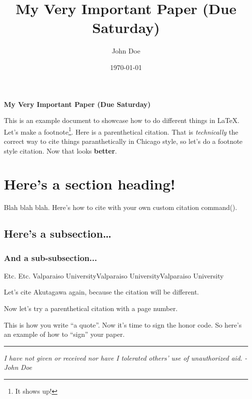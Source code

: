 \documentclass[letterpaper]{turabian-researchpaper}
\title{My Very Important Paper (Due Saturday)}
\subtitle{}
\author{John Doe}
\date{\today}
\newcommand{\ccparencite}[1]{(\citeauthor{#1})}
\newcommand{\vu}{Valparaiso University}
\begin{document}
\maketitle
\doublespacing

\begin{center}
	\textbf{My Very Important Paper (Due Saturday)}
\end{center}


This is an example document to showcase how to do different things in \LaTeX.
Let's make a footnote\footnote{It shows up!}. Here is a parenthetical citation\parencite{kant}.
That is \textit{technically} the correct way to cite things paranthetically in Chicago style, so let's
do a footnote style citation\autocite{akut, 34}. Now that looks \textbf{better}.

\section{Here's a section heading!}


Blah blah blah. Here's how to cite with your own custom citation command\ccparencite{kant, 23}.

\subsection{Here's a subsection\ldots}
\subsubsection{And a sub-subsection...}

Etc. Etc. \vu\vu\vu

Let's cite Akutagawa again\autocite{akut}, because the citation will be different.

Now let's try a parenthetical citation with a page number\parencite{mill, 54}.

This is how you write ``a quote''\parencite*{akut, 84}.
Now it's time to sign the honor code. So here's an example of
how to ``sign'' your paper.

\noindent\rule{\textwidth}{1pt} %
\begin{center}
	\textit{I have not given or received nor have I tolerated others' use of unauthorized aid.}
	\newline
	\textit{- John Doe}
\end{center}

\newpage
\printbibliography
\end{document}
